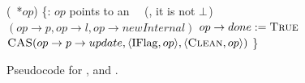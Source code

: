 \begin{figure*}
\begin{code}
		(\IFlag\ *$op$) \{\ul
		\n     {}:  $op$ points to an \IFlag\ \record\  (\ie, it is not $\mbox{$\bot$}$)\nlc
		$(op\rightarrow p, op\rightarrow l, op\rightarrow newInternal)$ \label{ichild-cas}\nlc
		\textcolor{blue}{$op \rightarrow done := \mbox{\sc True}$} \nlc 
		$\mbox{\sc CAS}(op\rightarrow p\rightarrow update, \langle \mbox{IFlag}, op \rangle, \langle \mbox{\sc Clean}, op\rangle)$  \label{iunflag-cas}\nlc
		\p
		\}
	\end{code}
	\caption{\label{code2}Pseudocode for ,  and .}
\end{figure*}

